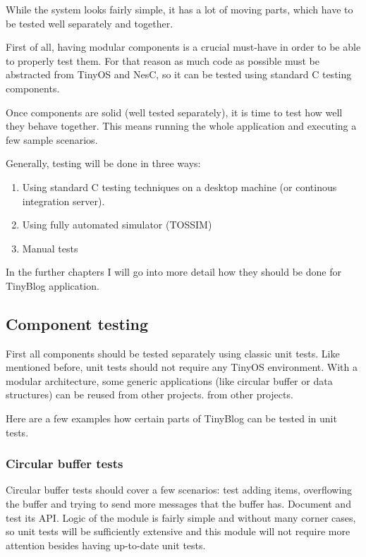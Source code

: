 \documentclass[english,11pt]{article}
\numberwithin{equation}{section}
\begin{document}
While the system looks fairly simple, it has a lot of moving parts, which have
to be tested well separately and together.

First of all, having modular components is a crucial must-have in order to be
able to properly test them. For that reason as much code as possible must be
abstracted from TinyOS and NesC, so it can be tested using standard C testing
components.

Once components are solid (well tested separately), it is time to test how well
they behave together. This means running the whole application and executing a
few sample scenarios.

Generally, testing will be done in three ways:
\begin{enumerate}
    \item Using standard C testing techniques on a desktop machine (or continous
        integration server).
    \item Using fully automated simulator (TOSSIM)
    \item Manual tests
\end{enumerate}

In the further chapters I will go into more detail how they should be done for
TinyBlog application.

\subsection{Component testing}

First all components should be tested separately using classic unit tests. Like
mentioned before, unit tests should not require any TinyOS environment. With a
modular architecture, some generic applications (like circular buffer or data
structures) can be reused from other projects. from other projects.

Here are a few examples how certain parts of TinyBlog can be tested in unit
tests.

\subsubsection{Circular buffer tests}

Circular buffer tests should cover a few scenarios: test adding items,
overflowing the buffer and trying to send more messages that the buffer has.
Document and test its API. Logic of the module is fairly simple and without many
corner cases, so unit tests will be sufficiently extensive and this module will
not require more attention besides having up-to-date unit tests.
\end{document}
